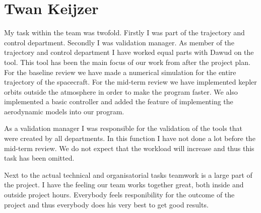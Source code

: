\section{Twan Keijzer}

My task within the team was twofold. Firstly I was part of the trajectory and control department. Secondly I was validation manager. As member of the trajectory and control department I have worked equal parts with Dawud on the tool. This tool has been the main focus of our work from after the project plan. For the baseline review we have made a numerical simulation for the entire trajectory of the spacecraft. For the mid-term review we have implemented kepler orbits outside the atmosphere in order to make the program faster. We also implemented a basic controller and added the feature of implementing the aerodynamic models into our program.

As a validation manager I was responsible for the validation of the tools that were created by all departments. In this function I have not done a lot before the mid-term review. We do not expect that the workload will increase and thus this task has been omitted.

Next to the actual technical and organisatorial tasks teamwork is a large part of the project. I have the feeling our team works together great, both inside and outside project hours. Everybody feels responibility for the outcome of the project and thus everybody does his very best to get good results.

